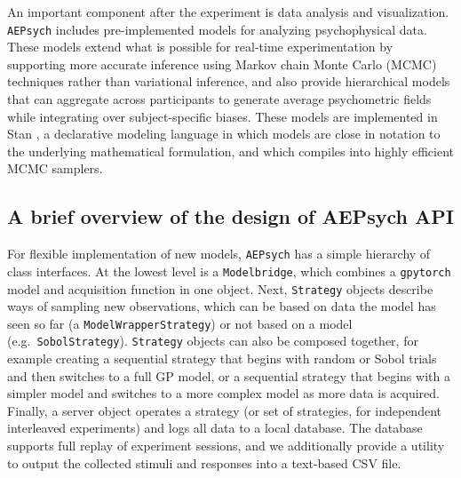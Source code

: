 \documentclass[../main.tex]{subfiles}
\begin{document}
An important component after the experiment is data analysis and visualization. \texttt{AEPsych} includes pre-implemented models for analyzing psychophysical data. These models extend what is possible for real-time experimentation by supporting more accurate inference using Markov chain Monte Carlo (MCMC) techniques rather than variational inference, and also provide hierarchical models that can aggregate across participants to generate average psychometric fields while integrating over subject-specific biases. These models are implemented in Stan \citep{Carpenter2017}, a declarative modeling language in which models are close in notation to the underlying mathematical formulation, and which compiles into highly efficient MCMC samplers.

\subsection{A brief overview of the design of AEPsych API}
For flexible implementation of new models, \texttt{AEPsych} has a simple hierarchy of class interfaces. At the lowest level is a \texttt{Modelbridge}, which combines a \texttt{gpytorch} model and acquisition function in one object. Next, \texttt{Strategy} objects describe ways of sampling new observations, which can be based on data the model has seen so far (a \texttt{ModelWrapperStrategy}) or not based on a model (e.g.\ \texttt{SobolStrategy}). \texttt{Strategy} objects can also be composed together, for example creating a sequential strategy that begins with random or Sobol trials and then switches to a full GP model, or a sequential strategy that begins with a simpler model and switches to a more complex model as more data is acquired. Finally, a server object operates a strategy (or set of strategies, for independent interleaved experiments) and logs all data to a local database. The database supports full replay of experiment sessions, and we additionally provide a utility to output the collected stimuli and responses into a text-based CSV file.
\end{document}
